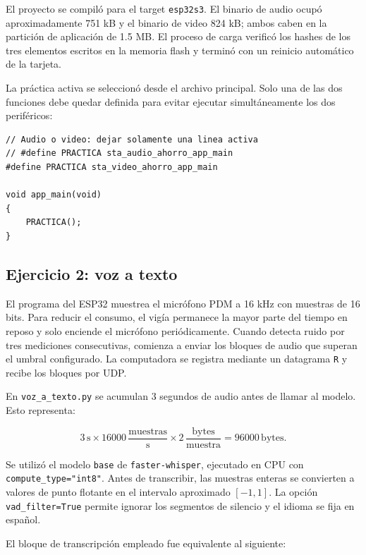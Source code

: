 \documentclass[12pt, letterpaper]{article}
\begin{document}
El proyecto se compiló para el target \texttt{esp32s3}. El binario de audio
ocupó aproximadamente 751 kB y el binario de video 824 kB; ambos caben en la
partición de aplicación de 1.5 MB. El proceso de carga verificó los hashes de
los tres elementos escritos en la memoria flash y terminó con un reinicio
automático de la tarjeta.

La práctica activa se seleccionó desde el archivo principal. Solo una de las
dos funciones debe quedar definida para evitar ejecutar simultáneamente los dos
periféricos:

\begin{lstlisting}[style=cstyle, caption={Selección del ejercicio activo}, label={lst:main-practica}]
// Audio o video: dejar solamente una linea activa
// #define PRACTICA sta_audio_ahorro_app_main
#define PRACTICA sta_video_ahorro_app_main

void app_main(void)
{
	PRACTICA();
}
\end{lstlisting}

\subsection*{\fontsize{12}{17}\selectfont Ejercicio 2: voz a texto}

El programa del ESP32 muestrea el micrófono PDM a 16 kHz con muestras de 16
bits. Para reducir el consumo, el vigía permanece la mayor parte del tiempo en
reposo y solo enciende el micrófono periódicamente. Cuando detecta ruido por
tres mediciones consecutivas, comienza a enviar los bloques de audio que
superan el umbral configurado. La computadora se registra mediante un datagrama
\texttt{R} y recibe los bloques por UDP.

En \texttt{voz\_a\_texto.py} se acumulan 3 segundos de audio antes de llamar al
modelo. Esto representa:

\[
    3\,\mathrm{s}\times 16000\,\frac{\mathrm{muestras}}{\mathrm{s}}
    \times 2\,\frac{\mathrm{bytes}}{\mathrm{muestra}}=96000\,\mathrm{bytes}.
\]

Se utilizó el modelo \texttt{base} de \texttt{faster-whisper}, ejecutado en CPU
con \texttt{compute\_type="int8"}. Antes de transcribir, las muestras enteras
se convierten a valores de punto flotante en el intervalo aproximado $[-1,1]$.
La opción \texttt{vad\_filter=True} permite ignorar los segmentos de silencio y
el idioma se fija en español.

El bloque de transcripción empleado fue equivalente al siguiente:
\end{document}
